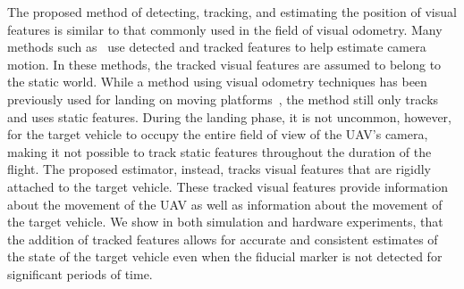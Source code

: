 The proposed method of detecting, tracking, and estimating the position of visual features is
similar to that commonly used in the field of visual odometry. Many methods such
as~\cite{qin2018vins,leutenegger2013keyframe,mourikis2007multi,mur2015orb} use
detected and tracked features to help estimate camera motion.
In these methods, the tracked visual features are assumed to belong to the
static world. While a method using visual odometry techniques has been
previously used for landing on
moving platforms~\cite{falanga2017vision}, the method still only tracks and uses
static features.
During the landing phase, it is not uncommon, however, for the target vehicle
to occupy the entire field of view of the UAV's camera, making it not possible
to track static features throughout the duration of the flight.
The proposed estimator, instead, tracks
visual features that are rigidly attached to the target vehicle. These tracked
visual features provide information about the movement of the UAV as well as
information about the movement of the target vehicle. We show in both
simulation and hardware experiments, that the addition of tracked features allows
for accurate and consistent estimates of the state of the target vehicle even
when the fiducial marker is not detected for significant periods of time.

